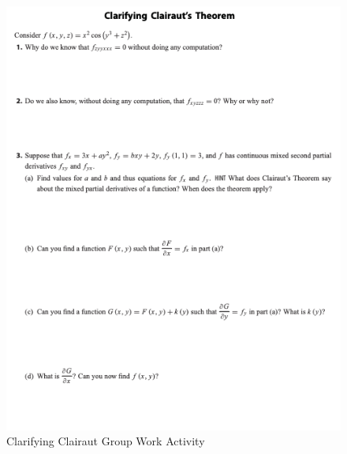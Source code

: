 \begin{figure}[!h]

\includegraphics[]{Clarifying-Clairaut.png}
\caption{Clarifying Clairaut Group Work Activity}
\end{figure}


